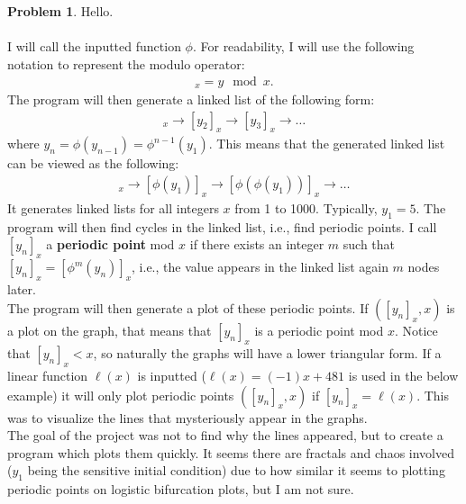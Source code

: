 \documentclass[fontsize=14pt]{scrartcl}
\theoremstyle{definition}
\newtheorem{problem-internal}{Problem}
\newenvironment{problem}{
\medskip
\begin{problem-internal}
}{
\end{problem-internal}
}
\begin{document}
\section*{}
\setcounter{section}{0}
\setcounter{problem-internal}{0}
\begin{problem}
Hello.\\\\
I will call the inputted function $\phi$. For readability, I will use the following notation to represent the modulo operator:
\begin{gather*}
[y]_x = y \mod x.
\end{gather*}
The program will then generate a linked list of the following form:
\begin{gather*}
[y_1]_x\rightarrow [y_2]_x\rightarrow [y_3]_x\rightarrow\hdots
\end{gather*}
where $y_n=\phi(y_{n-1})=\phi^{n-1}(y_1)$. This means that the generated linked list can be viewed as the following:
\begin{gather*}
[y_1]_x\rightarrow[\phi(y_1)]_x\rightarrow[\phi(\phi(y_1))]_x\rightarrow\hdots
\end{gather*}
It generates linked lists for all integers $x$ from 1 to 1000. 
Typically, $y_1=5$. The program will then find cycles in the linked list, i.e., find periodic points. I call $[y_n]_x$ a \textbf{periodic point} mod $x$ if there exists an integer $m$ such that $[y_n]_x=[\phi^m(y_n)]_x$, i.e., the value appears in the linked list again $m$ nodes later.\\
The program will then generate a plot of these periodic points. If $([y_n]_x, x)$ is a plot on the graph, that means that $[y_n]_x$ is a periodic point mod $x$. Notice that $[y_n]_x<x$, so naturally the graphs will have a lower triangular form.
If a linear function $\ell(x)$ is inputted ($\ell(x)=(-1)x+481$ is used in the below example) it will only plot periodic points $([y_n]_x,x)$ if $[y_n]_x=\ell(x)$. This was to visualize the lines that mysteriously appear in the graphs.\\
The goal of the project was not to find why the lines appeared, but to create a program which plots them quickly. It seems there are fractals and chaos involved ($y_1$ being the sensitive initial condition) due to how similar it seems to plotting periodic points on logistic bifurcation plots, but I am not sure.
\end{problem}
\end{document}
